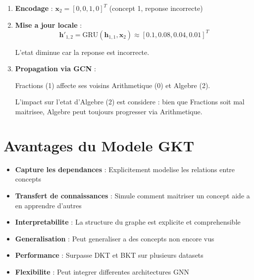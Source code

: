 \documentclass[11pt, a4paper]{article}
\begin{document}
\begin{enumerate}
    \item \textbf{Encodage} : $\mathbf{x}_2 = [0, 0, 1, 0]^T$ (concept 1, reponse incorrecte)

    \item \textbf{Mise a jour locale} :
          \begin{equation}
              \mathbf{h}'_{1,2} = \text{GRU}(\mathbf{h}_{1,1}, \mathbf{x}_2) \approx [0.1, 0.08, 0.04, 0.01]^T
          \end{equation}

          L'etat diminue car la reponse est incorrecte.

    \item \textbf{Propagation via GCN} :

          Fractions (1) affecte ses voisins Arithmetique (0) et Algebre (2).

          L'impact sur l'etat d'Algebre (2) est considere : bien que Fractions soit mal maitrisee, Algebre peut toujours progresser via Arithmetique.
\end{enumerate}

\section{Avantages du Modele GKT}

\begin{itemize}
    \item[$\checkmark$] \textbf{Capture les dependances} : Explicitement modelise les relations entre concepts

    \item[$\checkmark$] \textbf{Transfert de connaissances} : Simule comment maitriser un concept aide a en apprendre d'autres

    \item[$\checkmark$] \textbf{Interpretabilite} : La structure du graphe est explicite et comprehensible

    \item[$\checkmark$] \textbf{Generalisation} : Peut generaliser a des concepts non encore vus

    \item[$\checkmark$] \textbf{Performance} : Surpasse DKT et BKT sur plusieurs datasets

    \item[$\checkmark$] \textbf{Flexibilite} : Peut integrer differentes architectures GNN
\end{itemize}
\end{document}
